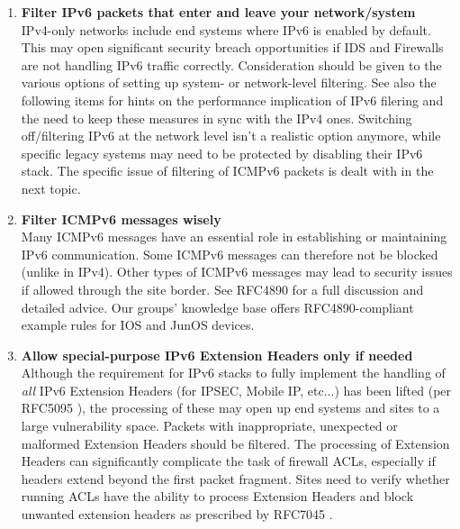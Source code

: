 \begin{enumerate}
\item {\bf Filter IPv6 packets that enter and leave your network/system}\\
IPv4-only networks include end systems where IPv6 is enabled by default.
This may open significant security breach opportunities
if IDS and Firewalls are not handling IPv6 traffic correctly.
Consideration should be given to the various options of setting
up system- or network-level filtering. See also the following items
for hints on the performance implication of IPv6 filering and the
need to keep these measures in sync with the IPv4 ones.
Switching off/filtering IPv6 at the network level isn't a realistic
option anymore, while specific legacy systems may need to be protected
by disabling their IPv6 stack.
The specific issue of filtering of ICMPv6 packets is dealt with in the
next topic. 


\item {\bf Filter ICMPv6 messages wisely} \\
Many ICMPv6 messages have an essential role in establishing or maintaining
IPv6 communication.
Some ICMPv6 messages can therefore not be blocked (unlike in IPv4).
Other types of ICMPv6 messages may lead to security issues if allowed through
the site border. See RFC4890 \cite{rfc} for a full discussion and detailed advice.
Our groups' knowledge base \cite{knowledgebase} offers RFC4890-compliant example
rules for IOS and JunOS devices.


\item {\bf Allow special-purpose IPv6 Extension Headers only if needed} \\
Although the requirement for IPv6 stacks to fully implement the handling
of {\it all} IPv6 Extension Headers (for IPSEC, Mobile IP, etc...) has been lifted
(per RFC5095 \cite{rfc}),
the processing of these may open up end systems and sites to a large
vulnerability space. 
Packets with inappropriate, unexpected or malformed Extension Headers should
be filtered. The processing of Extension Headers can significantly complicate the
task of firewall ACLs, especially if headers extend beyond the first packet
fragment.
Sites need to verify whether running ACLs have the ability to process Extension
Headers and block unwanted extension headers as prescribed by RFC7045
\cite{rfc}.



\end{enumerate}
